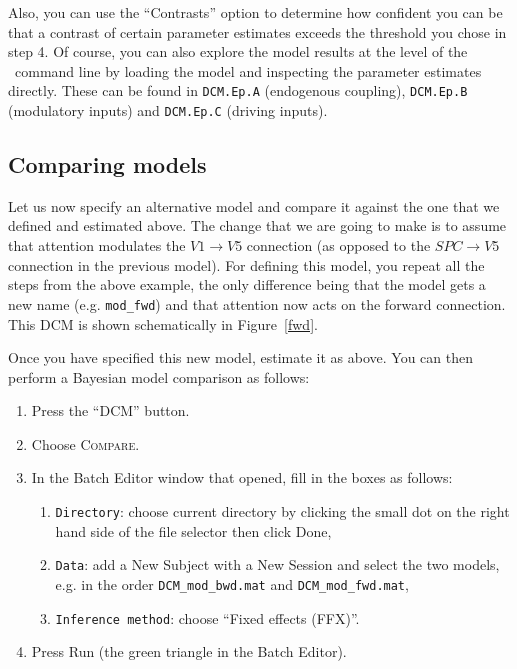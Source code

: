 Also, you can use the ``Contrasts'' option to determine how confident you can be that a contrast of certain parameter estimates exceeds the threshold you chose in step 4.
Of course, you can also explore the model results at the level of the \matlab\ command line by loading the model and inspecting the parameter estimates directly. These can be found in \texttt{DCM.Ep.A} (endogenous coupling), \texttt{DCM.Ep.B} (modulatory inputs) and \texttt{DCM.Ep.C} (driving inputs).

\subsection{Comparing models}

Let us now specify an alternative model and compare it against the one that we defined and estimated above. The change that we are going to make is to assume that attention modulates the $V1 \rightarrow V5$ connection (as opposed to the $SPC \rightarrow V5$ connection in the previous model). For defining this model, you repeat all the steps from the above example, the only difference being that the model gets a new name (e.g. \verb!mod_fwd!) and that attention now acts on the forward connection. This DCM is shown schematically in Figure~\ref{fwd}.

Once you have specified this new model, estimate it as above. You can then perform a Bayesian model comparison as follows:

\begin{enumerate}
 \item Press the ``DCM'' button.
 \item Choose \textsc{Compare}.
 \item In the Batch Editor window that opened, fill in the boxes as follows:
 \begin{enumerate}
   \item \texttt{Directory}: choose current directory by clicking the small dot on the right hand side of the file selector then click Done,
   \item \texttt{Data}: add a New Subject with a New Session and select the two models, e.g. in the order \texttt{DCM\_mod\_bwd.mat} and \texttt{DCM\_mod\_fwd.mat},
   \item \texttt{Inference method}: choose ``Fixed effects (FFX)''.
 \end{enumerate}
 \item Press Run (the green triangle in the Batch Editor).
\end{enumerate}


